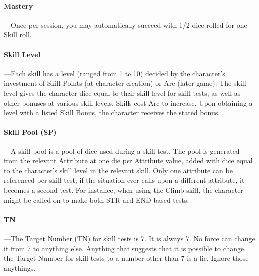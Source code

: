 \documentclass[oneside,11pt,english]{book}
\begin{document}
\paragraph{\label{par:Mastery}Mastery}
---\quad Once per session, you may automatically succeed with 1/2 dice rolled for one Skill roll.
\paragraph{\label{par:Skill Level}Skill Level}
---\quad Each skill has a level (ranged from 1 to 10) decided by the character’s investment of Skill Points (at character creation) or Arc (later game). The skill level gives the character dice equal to their skill level for skill tests, as well as other bonuses at various skill levels. Skills cost Arc to increase. Upon obtaining a level with a listed Skill Bonus, the character receives the stated bonus.
\paragraph{\label{par:Skill Pool}Skill Pool (SP)}
---\quad A skill pool is a pool of dice used during a skill test. The pool is generated from the relevant Attribute at one die per Attribute value, added with dice equal to the character’s skill level in the relevant skill. Only one attribute can be referenced per skill test; if the situation ever calls upon a different attribute, it becomes a second test. For instance, when using the Climb skill, the character might be called on to make both STR and END based tests.
\paragraph{\label{par:TN}TN}
---\quad The Target Number (TN) for skill tests is 7. It is always 7. No force can change it from 7 to anything else. Anything that suggests that it is possible to change the Target Number for skill tests to a number other than 7 is a lie. Ignore those anythings.
\end{document}
